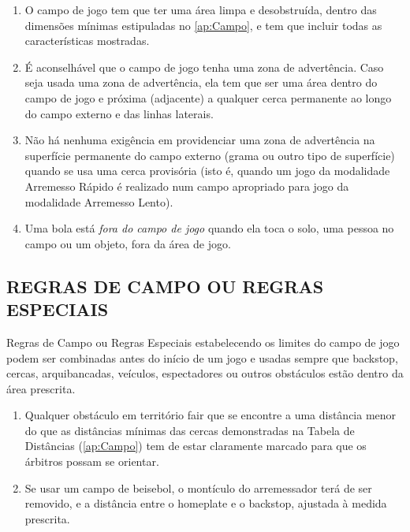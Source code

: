 \begin{enumerate}[label=\alph*)]
	\item O campo de jogo tem que ter uma \'area limpa e desobstru\'ida, dentro das dimens\~oes 
	m\'inimas estipuladas no \autoref{ap:Campo}, e tem que incluir todas as caracter\'isticas mostradas. 
	
	\item  \'E aconselh\'avel que o campo de jogo tenha uma zona de advert\^encia. Caso seja 
	usada uma zona de advert\^encia, ela tem que ser uma \'area dentro do campo de jogo e 
	pr\'oxima (adjacente) a qualquer cerca permanente ao longo do campo externo e das 
	linhas laterais. 
	
	\item  N\~ao h\'a nenhuma exig\^encia em providenciar uma zona de advert\^encia na superf\'icie permanente do campo externo (grama ou outro tipo de superf\'icie) quando se usa uma 
	cerca provis\'oria (isto \'e, quando um jogo da modalidade Arremesso R\'apido \'e realizado 
	num campo apropriado para jogo da modalidade Arremesso Lento). 
	
	\item  Uma bola est\'a \textit{fora do campo de jogo} quando ela toca o solo, uma pessoa no 
	campo ou um objeto, fora da \'area de jogo. 
\end{enumerate}

	\subsection{REGRAS DE CAMPO OU REGRAS ESPECIAIS }
Regras de Campo ou Regras Especiais estabelecendo os limites do campo de jogo 
podem ser combinadas antes do in\'icio de um jogo e usadas sempre que \gls{backstop}, 
cercas, arquibancadas, ve\'iculos, espectadores ou outros obst\'aculos est\~ao dentro da 
\'area prescrita. 

\begin{enumerate}[label=\alph*)]
	\item Qualquer obst\'aculo em territ\'orio \gls{fair} que se encontre a uma dist\^ancia menor do 	que as dist\^ancias m\'inimas das cercas demonstradas na Tabela de Dist\^ancias (\autoref{ap:Campo}) tem de estar claramente marcado para que os \'arbitros possam se orientar. 
	
	\item  Se usar um campo de beisebol, o mont\'iculo do arremessador ter\'a de ser removido, 
	e a dist\^ancia entre o \gls{homeplate} e o \gls{backstop}, ajustada \`a medida prescrita. 
\end{enumerate}
	
